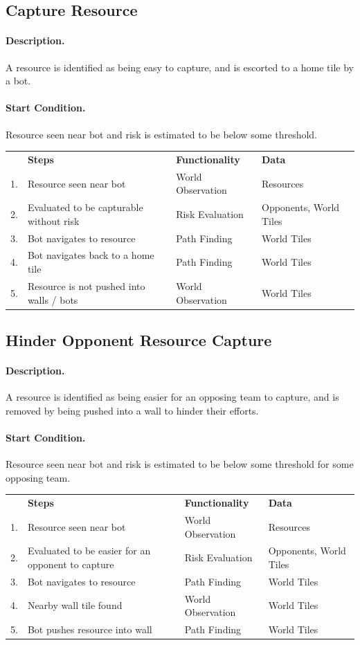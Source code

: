 \documentclass[a4paper,10pt]{article}
\begin{document}
\newcommand{\scenario}[4]{
  \subsection{#1}
  \paragraph{Description.}
  #2

  \vspace{-3mm}
  \paragraph{Start Condition.}
  #3

  \vspace{2mm}
  \begin{center}
  \begin{tabular}{r l l l}
    ~ & \textbf{Steps} & \textbf{Functionality} & \textbf{Data} \\
    #4
  \end{tabular}
  \end{center}
}

\scenario{Capture Resource}{
  A resource is identified as being easy to capture, and is escorted to a home tile by a bot.
}{
  Resource seen near bot and risk is estimated to be below some threshold.
}{
  1. & Resource seen near bot & World Observation & Resources \\
  2. & Evaluated to be capturable without risk & Risk Evaluation & Opponents, World Tiles \\
  3. & Bot navigates to resource & Path Finding & World Tiles \\
  4. & Bot navigates back to a home tile & Path Finding & World Tiles \\
  5. & Resource is not pushed into walls / bots & World Observation & World Tiles \\
}

\scenario{Hinder Opponent Resource Capture}{
  A resource is identified as being easier for an opposing team to capture, and is removed by being pushed into a wall to hinder their efforts.
}{
  Resource seen near bot and risk is estimated to be below some threshold for some opposing team.
}{
  1. & Resource seen near bot & World Observation & Resources \\
  2. & Evaluated to be easier for an opponent to capture & Risk Evaluation & Opponents, World Tiles \\
  3. & Bot navigates to resource & Path Finding & World Tiles \\
  4. & Nearby wall tile found & World Observation & World Tiles \\
  5. & Bot pushes resource into wall & Path Finding & World Tiles \\
}
\end{document}
